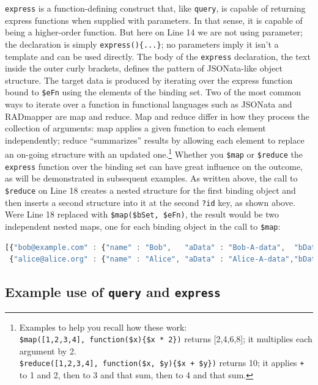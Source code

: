 \documentclass[10pt,letterpaper]{article} %
\newcommand{\stt}[1]{\texttt{#1}} %
\begin{document}
\stt{express} is a function-defining construct that, like \stt{query}, is capable of returning express functions when supplied with parameters.
In that sense, it is capable of being a higher-order function.
But here on Line 14 we are not using parameter; the declaration is simply \stt{express()\{...\}}; no parameters imply it isn't a template and can be used directly.
The body of the \stt{express} declaration, the text inside the outer curly brackets, defines the pattern of JSONata-like object structure.
The target data is produced by iterating over the express function bound to \stt{\$eFn} using the elements of the binding set.
Two of the most common ways to iterate over a function in functional languages such as JSONata and RADmapper are map and reduce.
Map and reduce differ in how they process the collection of arguments:
map applies a given function to each element independently;
reduce ``summarizes'' results by allowing each element to replace an on-going structure with an updated one.\footnote{Examples to help you recall how these work:
  \\ \stt{\$map([1,2,3,4], function(\$x)\{\$x * 2\})} returns [2,4,6,8]; it multiplies each argument by 2.
  \\ \stt{\$reduce([1,2,3,4], function(\$x, \$y)\{\$x + \$y\})} returns 10; it applies \stt{+} to 1 and 2, then to 3 and that sum,
  then to 4 and that sum.}
Whether you \stt{\$map} or \stt{\$reduce} the \stt{express} function over the binding set can have great influence on the outcome, as will be demonstrated in subsequent examples.
As written above, the call to \stt{\$reduce} on Line 18 creates a nested structure for the first binding object and then inserts a second structure into it at the second \stt{?id} key, as shown above.
Were Line 18 replaced with \stt{\$map(\$bSet, \$eFn)}, the result would be two independent nested maps, one for each binding object in the call to \stt{\$map}:

\begin{lstlisting}[language=JavaScript,basicstyle=\ttfamily\scriptsize,numbers=none]
[{"bob@example.com" : {"name" : "Bob",   "aData" : "Bob-A-data",  "bData" : "Bob-B-data"  }},
 {"alice@alice.org" : {"name" : "Alice", "aData" : "Alice-A-data","bData" : "Alice-B-data"}}].
\end{lstlisting} \vspace{-2em}

\subsection{Example use of  \stt{query}  and  \stt{express} }
\end{document}

